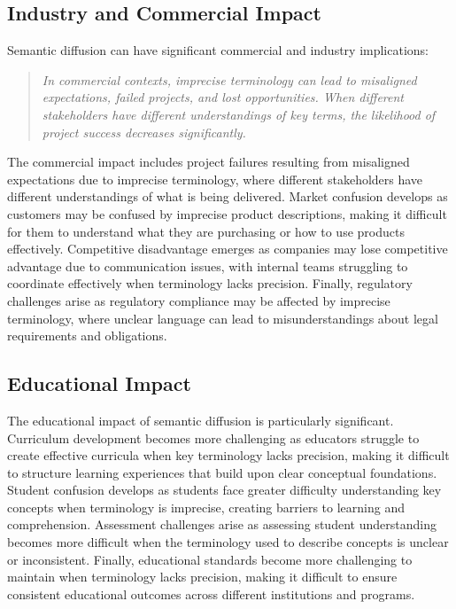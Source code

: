 \documentclass[11pt]{article}
\begin{document}
\subsection{Industry and Commercial Impact}

Semantic diffusion can have significant commercial and industry implications:

\begin{quote}
\emph{In commercial contexts, imprecise terminology can lead to misaligned expectations, failed projects, and lost opportunities. When different stakeholders have different understandings of key terms, the likelihood of project success decreases significantly.}
\end{quote}

The commercial impact includes project failures resulting from misaligned expectations due to imprecise terminology, where different stakeholders have different understandings of what is being delivered. Market confusion develops as customers may be confused by imprecise product descriptions, making it difficult for them to understand what they are purchasing or how to use products effectively. Competitive disadvantage emerges as companies may lose competitive advantage due to communication issues, with internal teams struggling to coordinate effectively when terminology lacks precision. Finally, regulatory challenges arise as regulatory compliance may be affected by imprecise terminology, where unclear language can lead to misunderstandings about legal requirements and obligations.

\subsection{Educational Impact}

The educational impact of semantic diffusion is particularly significant. Curriculum development becomes more challenging as educators struggle to create effective curricula when key terminology lacks precision, making it difficult to structure learning experiences that build upon clear conceptual foundations. Student confusion develops as students face greater difficulty understanding key concepts when terminology is imprecise, creating barriers to learning and comprehension. Assessment challenges arise as assessing student understanding becomes more difficult when the terminology used to describe concepts is unclear or inconsistent. Finally, educational standards become more challenging to maintain when terminology lacks precision, making it difficult to ensure consistent educational outcomes across different institutions and programs.
\end{document}

